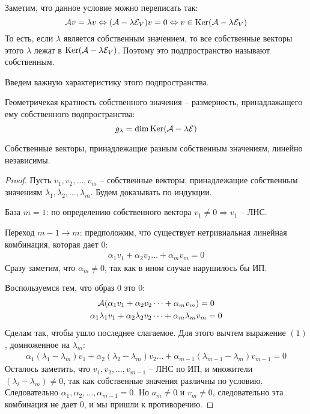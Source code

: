 Заметим, что данное условие можно переписать так:
\[ \mathcal{A} v = \lambda v \Leftrightarrow (\mathcal{A} - \lambda\mathcal{E}_V)v = 0 \Leftrightarrow v \in \operatorname{Ker}(\mathcal{A} - \lambda\mathcal{E}_V) \]
То есть, если $\lambda$ является собственным значением, то все собственные векторы этого $\lambda$ лежат в $\operatorname{Ker}(\mathcal{A} - \lambda\mathcal{E}_V)$. 
Поэтому это подпространство называют собственным.

Введем важную характеристику этого подпространства.

\begin{conj}
    Геометричекая кратность собственного значения -- размерность, принадлажащего ему собственного подпространства:
    \[ g_\lambda = \dim \operatorname{Ker}(\mathcal{A} - \lambda\mathcal{E}) \]
\end{conj}

\begin{theorem-non}
    Собственные векторы, принадлежащие разным собственным значениям, линейно независимы.
\end{theorem-non}

\begin{proof}
    Пусть $v_1, v_2, \dots, v_m$ -- собственные векторы, принадлежащие собственным значениям $\lambda_1, \lambda_2, \dots, \lambda_m$.
    Будем доказывать по индукции.
    
    База $m = 1$: по определению собственного вектора $v_1 \neq 0 \Rightarrow v_1$ -- ЛНС.

    Переход $m - 1 \to m$: предположим, что существует нетривиальная линейная комбинация, которая дает 0:
    \begin{gather}
        \alpha_1v_1 + \alpha_2v_2 \dots + \alpha_mv_m = 0
    \end{gather}
    \quad Сразу заметим, что $\alpha_m \neq 0$, так как в ином случае нарушилось бы ИП. 

    \quad Воспользуемся тем, что образ 0 это 0:
    \begin{gather*}
        \mathcal{A}(\alpha_1v_1 + \alpha_2v_2 \dots + \alpha_mv_m) = 0 \\
        \alpha_1\lambda_1v_1 + \alpha_2\lambda_2v_2 \dots + \alpha_m\lambda_mv_m = 0
    \end{gather*}
    \quad Сделам так, чтобы ушло последнее слагаемое.
    Для этого вычтем выражение $(1)$, домноженное на $\lambda_m$:
    \begin{gather*}
        \alpha_1(\lambda_1 - \lambda_m)v_1 + \alpha_2(\lambda_2 - \lambda_m)v_2 \dots + \alpha_{m - 1}(\lambda_{m - 1} - \lambda_m)v_{m - 1} = 0
    \end{gather*}
    \quad Осталось заметить, что $v_1, v_2, \dots, v_{m - 1}$ -- ЛНС по ИП, и множители $(\lambda_i - \lambda_m) \neq 0$, так как собственные значения различны по условию.
    Следовательно $\alpha_1, \alpha_2, \dots, \alpha_{m-1} = 0$. 
    Но $a_m \neq 0$ и $v_m \neq 0$, следовательно эта комбинация не дает 0, и мы пришли к противоречию.
\end{proof}

